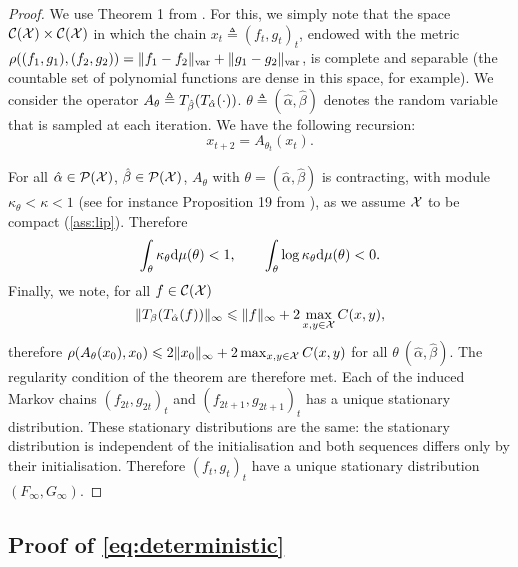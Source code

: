 \begin{proof}
    We use Theorem 1 from \citet{diaconis_iterated}. For this, we simply note
    that the space $\mathcal{C}(\mathcal{X}) \times \mathcal{C}(\mathcal{X})$ in which the chain ${x_t
    \triangleq (f_t, g_t)}_t$, endowed with the metric $\rho((f_1, g_1), (f_2,
    g_2)) = \Vert f_1 - f_2 \Vert_{\text{\upshape var}} + \Vert g_1 - g_2 \Vert_{\text{\upshape var}}$, is
    complete and separable (the countable set of polynomial functions are dense in this space, for example).
    We consider the operator $A_{\theta} \triangleq T_{\hat \beta}(T_{\hat
    \alpha}(\cdot))$. $\theta \triangleq (\hat \alpha, \hat \beta)$ denotes
    the random variable that is sampled at each iteration. We have the following
    recursion:
    \begin{equation}
        x_{t+2} = A_{\theta_t}(x_t).
    \end{equation}
    
    For all $\hat \alpha \in \mathcal{P}(\mathcal{X})$, $\hat \beta \in \mathcal{P}(\mathcal{X})$, $A_{\theta}$
    with $\theta = (\hat \alpha, \hat \beta)$ is contracting, with module
    $\kappa_\theta < \kappa < 1$ (see for instance Proposition 19
    from \citet{vialard2019elementary}), as we assume $\mathcal{X}$ to be compact
    (\autoref{ass:lip}). Therefore
    \begin{equation}
        \int_{\theta} \kappa_\theta \textrm{d} \mu(\theta) < 1, \qquad \int_{\theta}
         \log \kappa_\theta \textrm{d} \mu(\theta) < 0.
    \end{equation}
    Finally, we note, for all $f \in \mathcal{C}(\mathcal{X})$
    \begin{equation}
        \Vert T_{\beta}(T_{\hat \alpha}(f)) \Vert_{\infty} 
        \leqslant \Vert f \Vert_\infty + 2 \max_{x,y \in \mathcal{X}} C(x, y),
    \end{equation}
    therefore $\rho(A_\theta(x_0), x_0) \leqslant 2 \Vert x_0 \Vert_\infty + 2
    \max_{x,y \in \mathcal{X}} C(x, y)$ for all $\theta \ (\hat \alpha, \hat \beta)$.
    The regularity condition of the theorem are therefore met. Each of the
    induced Markov chains ${(f_{2t}, g_{2t})}_t$ and ${(f_{2t + 1}, g_{2t +
    1})}_t$ has a unique stationary distribution. These stationary distributions
    are the same: the stationary distribution is independent of the
    initialisation and both sequences differs only by their initialisation.
    Therefore ${(f_{t}, g_{t})}_t$ have a unique stationary distribution
    $(F_\infty, G_\infty)$.
\end{proof}

\subsection{Proof of \autoref{eq:deterministic}}


